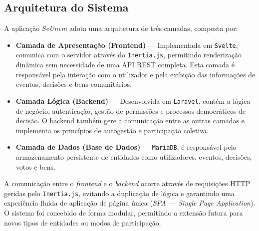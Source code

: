 \documentclass[12pt,a4paper,openright,oneside]{memoir}
\begin{document}
\subsection{Arquitetura do Sistema}
\label{sec:arquitetura}

A aplicação \textit{SeUnem} adota uma arquitetura de três camadas, composta por:

\begin{itemize}
  \item \textbf{Camada de Apresentação (Frontend)} — Implementada em
      \texttt{Svelte}, comunica com o servidor através do \texttt{Inertia.js},
        permitindo renderização dinâmica sem necessidade de uma API REST
        completa. Esta camada é responsável pela interação com o utilizador e
        pela exibição das informações de eventos, decisões e bens comunitários.

  \item \textbf{Camada Lógica (Backend)} — Desenvolvida em \texttt{Laravel},
      contém a lógica de negócio, autenticação, gestão de permissões e
        processos democráticos de decisão. O backend também gere a comunicação
        entre as outras camadas e implementa os princípios de autogestão e
        participação coletiva.

  \item \textbf{Camada de Dados (Base de Dados)} — \texttt{MariaDB}, é
      responsável pelo armazenamento persistente de entidades como
        utilizadores, eventos, decisões, votos e bens.
\end{itemize}

A comunicação entre o \textit{frontend} e o \textit{backend} ocorre através de
requisições HTTP geridas pelo \texttt{Inertia.js}, evitando a duplicação de
lógica e garantindo uma experiência fluida de aplicação de página única
(\textit{SPA — Single Page Application}). O sistema foi concebido de forma
modular, permitindo a extensão futura para novos tipos de entidades ou modos
de participação.


\end{document}
